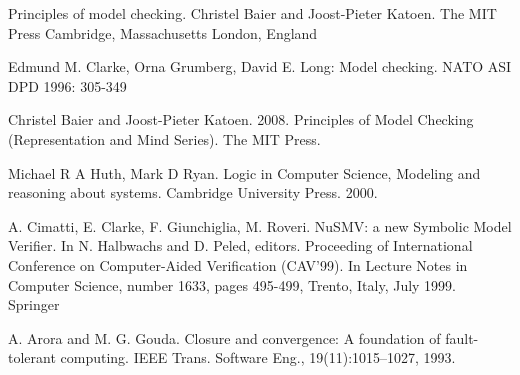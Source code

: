 \documentclass[titlepage, 12pt]{book}
\begin{document}
\begin{thebibliography}{99}
 Principles of model checking. Christel Baier and Joost-Pieter Katoen. The MIT Press Cambridge, Massachusetts
London, England

 Edmund M. Clarke, Orna Grumberg, David E. Long: Model checking. NATO ASI DPD 1996: 305-349

 Christel Baier and Joost-Pieter Katoen. 2008. Principles of Model Checking (Representation and Mind Series). The MIT Press.

 Michael R A Huth, Mark D Ryan. Logic in Computer Science, Modeling and reasoning about systems. Cambridge University Press. 2000.

 A. Cimatti, E. Clarke, F. Giunchiglia, M. Roveri. NuSMV: a new Symbolic Model Verifier. In N. Halbwachs and D. Peled, editors. Proceeding of International Conference on Computer-Aided Verification (CAV'99). In Lecture Notes in Computer Science, number 1633, pages 495-499, Trento, Italy, July 1999. Springer

 A. Arora and M. G. Gouda. Closure and convergence: A foundation of fault-tolerant computing. IEEE Trans. Software Eng., 19(11):1015–1027, 1993.


\end{thebibliography}
\end{document}
